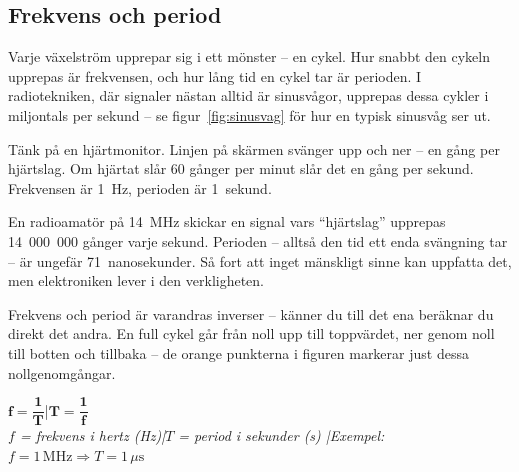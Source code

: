 \documentclass[a4paper,11pt,twoside]{book}
\newcommand{\emoji}[1]{{\emojifont #1}}
\begin{document}
\subsection{Frekvens och period}

Varje växelström upprepar sig i ett mönster -- en
cykel. Hur snabbt den cykeln upprepas är frekvensen,
och hur lång tid en cykel tar är perioden.
I radiotekniken, där signaler nästan alltid är
sinusvågor, upprepas dessa cykler i miljontals per
sekund -- se figur~\ref{fig:sinusvag} för hur en
typisk sinusvåg ser ut.

\begin{storybox}[{\emoji{💡} Hjärtat och metronomen}]
Tänk på en hjärtmonitor. Linjen på skärmen svänger
upp och ner -- en gång per hjärtslag. Om hjärtat slår
60 gånger per minut slår det en gång per sekund.
Frekvensen är 1~Hz, perioden är 1~sekund.

En radioamatör på 14~MHz skickar en signal vars
``hjärtslag'' upprepas 14~000~000 gånger varje sekund.
Perioden -- alltså den tid ett enda svängning tar --
är ungefär 71~nanosekunder. Så fort att inget
mänskligt sinne kan uppfatta det, men elektroniken
lever i den verkligheten.
\end{storybox}

Frekvens och period är varandras inverser --
känner du till det ena beräknar du direkt det andra.
En full cykel går från noll upp till toppvärdet,
ner genom noll till botten och tillbaka -- de orange
punkterna i figuren markerar just dessa nollgenomgångar.

\begin{formulabox}
{\large$\mathbf{f = \dfrac{1}{T}}$\quad|\quad$\mathbf{T = \dfrac{1}{f}}$}\\[3mm]
{\small\normalfont\itshape
$f$ = frekvens i hertz (Hz)\quad|\quad$T$ = period i sekunder (s)
\quad|\quad Exempel: $f = 1\,\text{MHz} \Rightarrow T = 1\,\mu\text{s}$}
\end{formulabox}
\end{document}
